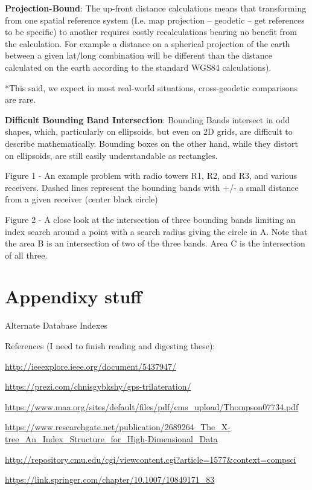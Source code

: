 \documentclass[]{article}
\begin{document}
\textbf{Projection-Bound}: The up-front distance calculations means that
transforming from one spatial reference system (I.e. map projection --
geodetic -- get references to be specific) to another requires costly
recalculations bearing no benefit from the calculation. For example a
distance on a spherical projection of the earth between a given lat/long
combination will be different than the distance calculated on the earth
according to the standard WGS84 calculations).

*This said, we expect in most real-world situations, cross-geodetic
comparisons are rare.

\textbf{Difficult Bounding Band Intersection}: Bounding Bands intersect
in odd shapes, which, particularly on ellipsoids, but even on 2D grids,
are difficult to describe mathematically. Bounding boxes on the other
hand, while they distort on ellipsoids, are still easily understandable
as rectangles.

Figure 1 - An example problem with radio towers R1, R2, and R3, and
various receivers. Dashed lines represent the bounding bands with +/- a
small distance from a given receiver (center black circle)

Figure 2 - A close look at the intersection of three bounding bands
limiting an index search around a point with a search radius giving the
circle in A. Note that the area B is an intersection of two of the three
bands. Area C is the intersection of all three.

\section{Appendixy stuff}\label{appendixy-stuff}

Alternate Database Indexes

References (I need to finish reading and digesting these):

\url{http://ieeexplore.ieee.org/document/5437947/}

\url{https://prezi.com/chnisgybkshy/gps-trilateration/}

\url{https://www.maa.org/sites/default/files/pdf/cms_upload/Thompson07734.pdf}

\url{https://www.researchgate.net/publication/2689264_The_X-tree_An_Index_Structure_for_High-Dimensional_Data}

\url{http://repository.cmu.edu/cgi/viewcontent.cgi?article=1577\&context=compsci}

\url{https://link.springer.com/chapter/10.1007/10849171_83}
\end{document}
